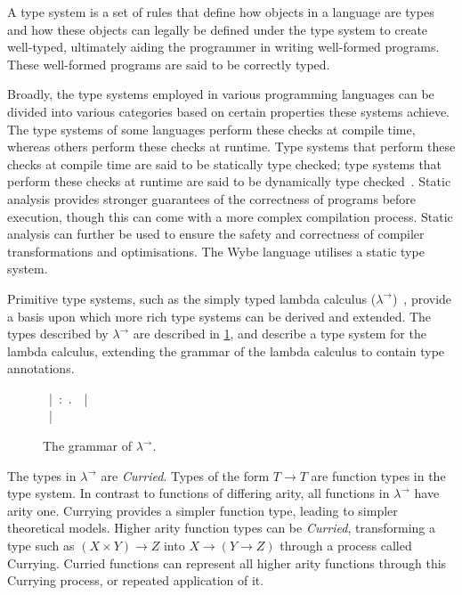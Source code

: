 A type system is a set of rules that define how objects in a language are types and how these objects can legally be defined under the type system to create well-typed, ultimately aiding the programmer in writing well-formed programs. These well-formed programs are said to be correctly typed.~\cite{pierce2002types} 

Broadly, the type systems employed in various programming languages can be divided into various categories based on certain properties these systems achieve. The type systems of some languages perform these checks at compile time, whereas others perform these checks at runtime. Type systems that perform these checks at compile time are said to be statically type checked; type systems that perform these checks at runtime are said to be dynamically type checked~\cite{pierce2002types}. Static analysis provides stronger guarantees of the correctness of programs before execution, though this can come with a more complex compilation process. Static analysis can further be used to ensure the safety and correctness of compiler transformations and optimisations. The Wybe language utilises a static type system.

Primitive type systems, such as the simply typed lambda calculus ($\lambda^\to$)~\cite{church1940formulation}, provide a basis upon which more rich type systems can be derived and extended. The types described by $\lambda^\to$ are described in \cref{fig:lit-review--simple-grammar}, and describe a type system for the lambda calculus, extending the grammar of the lambda calculus to contain type annotations.

\begin{figure}[ht]
  \begin{bnf*}
      {\ |\ \lambda {}:\ .\ \ |\ \ } \\
      {\ |\  \to {}}
  \end{bnf*}
  \caption{The grammar of $\lambda^\to$.}
  \label{fig:lit-review--simple-grammar}
\end{figure}

The types in $\lambda^\to$ are \textit{Curried}. Types of the form $T \to T$ are function types in the type system. In contrast to functions of differing arity, all functions in $\lambda^\to$ have arity one. Currying provides a simpler function type, leading to simpler theoretical models. Higher arity function types can be \textit{Curried}, transforming a type such as $(X \times Y) \to Z$ into $X \to (Y \to Z)$ through a process called Currying. Curried functions can represent all higher arity functions through this Currying process, or repeated application of it.
 
